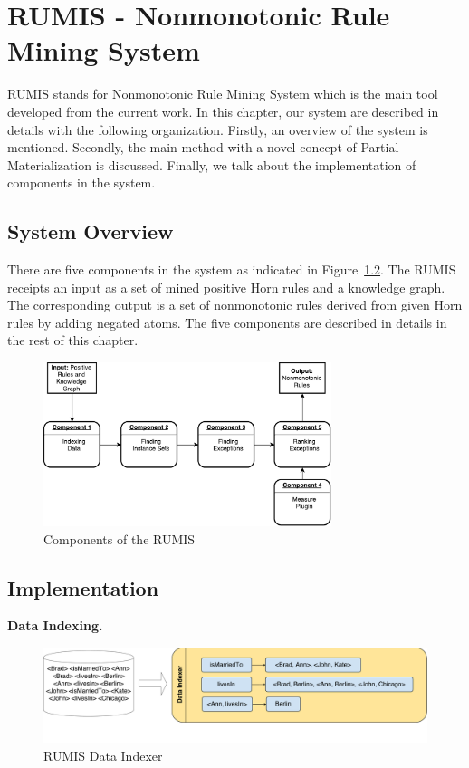\chapter{RUMIS - Nonmonotonic Rule Mining System}\label{sec:meth}

RUMIS stands for Nonmonotonic Rule Mining System which is the main tool developed from the current work. In this chapter, our system are described in details with the following organization. Firstly, an overview of the system is mentioned. Secondly, the main method with a novel concept of Partial Materialization is discussed. Finally, we talk about the implementation of components in the system.

\section{System Overview}

There are five components in the system as indicated in Figure~\ref{system_overview}. The RUMIS receipts an input as a set of mined positive Horn rules and a knowledge graph. The corresponding output is a set of nonmonotonic rules derived from given Horn rules by adding negated atoms. The five components are described in details in the rest of this chapter.

\begin{figure}[ht]
\centering
\includegraphics[width=0.75\textwidth]{figures/system_overview}
\caption{Components of the RUMIS}
\label{system_overview}
\end{figure}

\section{Implementation}

\textbf{Data Indexing.}

\begin{figure}[ht]
\centering
\includegraphics[width=1.0\textwidth]{figures/data_indexing}
\caption{RUMIS Data Indexer}
\label{system_overview}
\end{figure}

